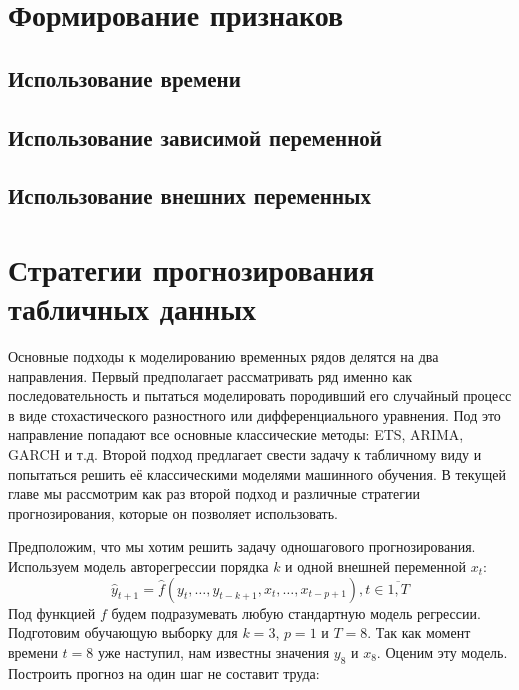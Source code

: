 \documentclass[12pt,fleqn]{article}
\begin{document}
	
\section{Формирование признаков}

\subsection{Использование времени}

\subsection{Использование зависимой переменной}

\subsection{Использование внешних переменных}

\section{Стратегии прогнозирования табличных данных}

Основные подходы к моделированию временных рядов делятся на два направления. Первый предполагает рассматривать ряд именно как последовательность и пытаться моделировать породивший его случайный процесс в виде стохастического разностного или дифференциального уравнения. Под это направление попадают все основные классические методы: ETS, ARIMA, GARCH и т.д. Второй подход предлагает свести задачу к табличному виду и попытаться решить её классическими моделями машинного обучения. В текущей главе мы рассмотрим как раз второй подход и различные стратегии прогнозирования, которые он позволяет использовать.


Предположим, что мы хотим решить задачу одношагового прогнозирования. Используем модель авторегрессии порядка $k$ и одной внешней переменной $x_t$:  
$$
\hat{y}_{t+1} = \hat{f}(y_t, \ldots, y_{t-k+1}, x_{t}, \ldots, x_{t-p+1}), t \in \overline{1, T}
$$
 Под функцией $f$ будем подразумевать любую стандартную модель регрессии. Подготовим обучающую выборку для $k=3$, $p=1$ и $T=8$. Так как момент времени $t=8$ уже наступил, нам известны значения $y_8$ и $x_8$. Оценим эту модель. Построить прогноз на один шаг не составит труда:
\end{document}

